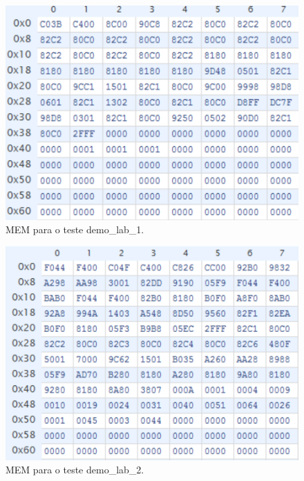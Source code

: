 \documentclass[a4paper]{article}
\begin{document}
		\begin{figure}[h]
			\centering
			\includegraphics[width=1.\textwidth]{img/imem_1}
			\caption{MEM para o teste demo\_lab\_1.}
			\label{fig:imem_1}
		\end{figure}
		\begin{figure}[h]
			\centering
			\includegraphics[width=1.\textwidth]{img/imem_2}
			\caption{MEM para o teste demo\_lab\_2.}
			\label{fig:imem_2}
		\end{figure}
\end{document}
